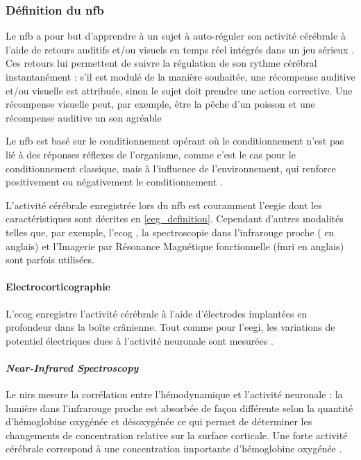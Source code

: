 \subsubsection{Définition du \gls{nfb}}

Le \gls{nfb} a pour but d'apprendre à un sujet à auto-réguler son activité cérébrale à l'aide de retours auditifs et/ou visuels en temps réel
intégrés dans un jeu sérieux \citep{Wang2010, Marzbani2016}. Ces retours lui permettent de suivre la régulation de son rythme cérébral instantanément : s'il est modulé de 
la manière souhaitée, une récompense auditive et/ou visuelle est attribuée, sinon le sujet doit prendre une action corrective. Une récompense visuelle
peut, par exemple, être la pêche d'un poisson \citep{Bioulac2019} et une récompense auditive un son agréable \citep{Strehl2006}

Le \gls{nfb} est basé sur le conditionnement opérant \citep{Reynolds1975} où le conditionnement n'est pas lié à 
des réponses réflexes de l'organisme, comme c'est le cas pour le conditionnement classique, mais à l'influence de l'environnement, qui 
renforce positivement ou négativement le conditionnement \citep{Skinner1948}. 

L'activité cérébrale enregistrée lors du \gls{nfb} est couramment l'\gls{eegie} dont les caractéristiques sont décrites en \ref{eeg_definition}.
Cependant d'autres modalités telles que, par exemple, 
l'\gls{ecog} \citep{Khanna2016, Gharabaghi2014}, la spectroscopie dans l'infrarouge proche ( en anglais) \citep{Marx2015} et 
l'Imagerie par Résonance Magnétique fonctionnelle (\gls{fmri} en anglais) \citep{Sulzer2013}
sont parfois utilisées. 

\paragraph{Electrocorticographie} 
L'\gls{ecog} enregistre l'activité cérébrale à l'aide d'électrodes implantées en profondeur dans la boîte crânienne. Tout comme pour l'\gls{eegi}, 
les variations de potentiel électriques dues à l'activité neuronale sont mesurées \citep{Leuthardt2006}. 

\paragraph{\textit{Near-Infrared Spectroscopy}} 
Le \gls{nirs} mesure la corrélation entre l'hémodynamique et l'activité neuronale : la lumière dans l'infrarouge proche est absorbée de
façon différente selon la quantité d'hémoglobine oxygénée et désoxygénée ce qui permet de déterminer les changements de concentration relative
sur la surface corticale. Une forte activité cérébrale correspond à une concentration importante d'hémoglobine oxygénée \citep{Fallgatter1997, Marx2015}. 

